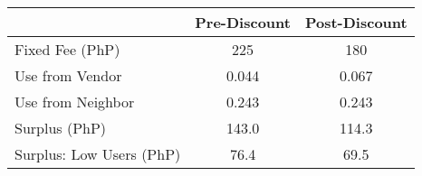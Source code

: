 \begin{tabular}{lcc}
& Pre-Discount & Post-Discount \\
\hline
Fixed Fee (PhP) &225&180\\
Use from Vendor & 0.044 & 0.067 \\
Use from Neighbor & 0.243 &0.243 \\
 Surplus  (PhP) &143.0&114.3 \\
 Surplus: Low Users (PhP)  &76.4&69.5 \\
\hline
\end{tabular}
